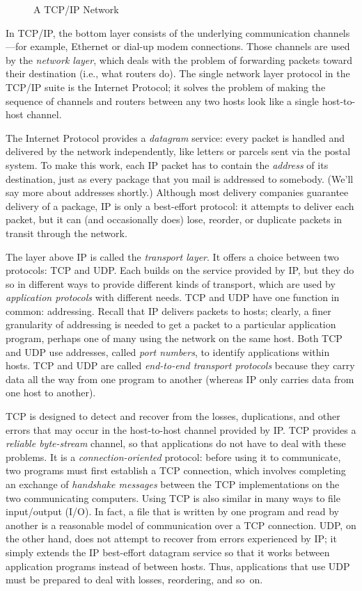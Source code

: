 \begin{figure}[htbp]
\caption{\label{fig:IPnet}A TCP/IP Network}
\end{figure}

In TCP/IP, the bottom layer consists of the underlying communication
channels---for example, Ethernet or dial-up modem connections.  Those
channels are used by the \emph{network layer}, which deals with the
problem of forwarding packets toward their destination (i.e., what
routers do).  The single network layer protocol in the TCP/IP suite is
the Internet Protocol; it solves the problem of making the sequence of
channels and routers between any two hosts look like a single
host-to-host channel.

The Internet Protocol provides a \emph{datagram} service: every packet
is handled and delivered by the network independently, like letters or
parcels sent via the postal system.  To make this work, each IP packet
has to contain the \emph{address} of its destination, just as every
package that you mail is addressed to somebody.  (We'll say more about
addresses shortly.)  Although most delivery companies guarantee
delivery of a package, IP is only a best-effort protocol: it attempts
to deliver each packet, but it can (and occasionally does) lose,
reorder, or duplicate packets in transit through the network.

The layer above IP is called the \emph{transport layer}.  It offers a
choice between two protocols: TCP and UDP.  Each builds on the service
provided by IP, but they do so in different ways to provide different
kinds of transport, which are used by \emph{application protocols}
with different needs.  TCP and UDP have one function in common:
addressing.  Recall that IP delivers packets to hosts; clearly, a
finer granularity of addressing is needed to get a packet to a
particular application program, perhaps one of many using the network on the
same host.  Both TCP and UDP use addresses, called \emph{port
numbers}, to identify applications within hosts.  TCP and UDP are called
\emph{end-to-end transport protocols} because they carry data all the
way from one program to another (whereas IP only carries data from one
host to another).

TCP is designed to detect and recover from the losses, duplications,
and other errors that may occur in the host-to-host channel provided
by IP.  TCP provides a \emph{reliable byte-stream} channel, so that
applications do not have to deal with these problems.  It is a
\emph{connection-oriented} protocol: before using it to communicate,
two programs must first {establish a TCP connection}, which involves
completing an exchange of \emph{handshake messages} between the TCP
implementations on the two communicating computers.  Using TCP is also
similar in many ways to file input/output (I/O). In fact, a file that
is written by one program and read by another is a reasonable model of
communication over a TCP connection.  UDP, on the other hand, does not
attempt to recover from errors experienced by IP; it simply extends
the IP best-effort datagram service so that it works between
application programs instead of between hosts.  Thus, applications
that use UDP must be prepared to deal with losses, reordering, and
so~on.

